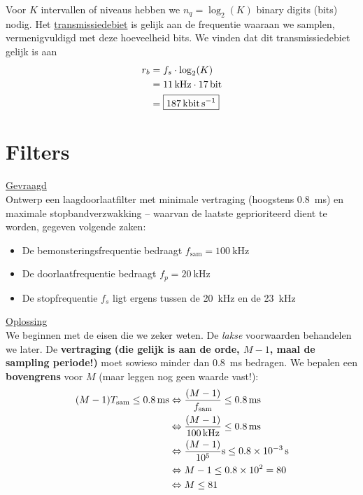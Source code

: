 \documentclass[kulak]{kulakarticle}
\newcommand{\sam}{\text{sam}}
\begin{document}
\begin{enumerate}
\begin{itemize}
			Voor \( K \) intervallen of niveaus hebben we \( n_q=\log_2(K) \) binary digits (bits) nodig. Het \underline{transmissiedebiet} is gelijk aan de frequentie waaraan we samplen, vermenigvuldigd met deze hoeveelheid bits. We vinden dat dit transmissiedebiet gelijk is aan \begin{align*}
				r_b &= f_s \cdot \log_2(K) \\
				&= \SI{11}{\kilo\hertz} \cdot \SI{17}{\bit} \\
				&= \boxed{\SI{187}{\kilo\bit\per\second}}
			\end{align*}

		\end{itemize}


	\end{enumerate}

	\newpage
	\section{Filters}


	\underline{Gevraagd} \\

	Ontwerp een laagdoorlaatfilter met minimale vertraging (hoogstens \SI{0.8}{\milli\second}) en maximale stopbandverzwakking -- waarvan de laatste geprioriteerd dient te worden, gegeven volgende zaken:

	\begin{itemize}
		\item De bemonsteringsfrequentie bedraagt \(f_{\text{sam}}=\SI{100}{\kilo\hertz}\)
		\item De doorlaatfrequentie bedraagt \(f_p=\SI{20}{\kilo\hertz}\)
		\item De stopfrequentie \(f_s\) ligt ergens tussen de \SI{20}{\kilo\hertz} en de \SI{23}{\kilo\hertz}
	\end{itemize}

	\underline{Oplossing}\\

	We beginnen met de eisen die we zeker weten. De \textit{lakse} voorwaarden behandelen we later. De \textbf{vertraging} \textbf{(die gelijk is aan de orde, \(M-1\), maal de sampling periode!)} moet sowieso minder dan \SI{0.8}{\milli\second} bedragen. We bepalen een \textbf{bovengrens} voor \(M\) (maar leggen nog geen waarde vast!):
	\begin{align*}
		(M-1) T_\sam \leq \SI{0.8}{\milli\second} &\Leftrightarrow \frac{(M-1)}{f_\sam}\leq \SI{0.8}{\milli\second} \\
		& \Leftrightarrow \frac{(M-1)}{\SI{100}{\kilo\hertz}}\leq \SI{0.8}{\milli\second} \\
		& \Leftrightarrow \frac{(M-1)}{10^5} \SI{}{\second}\leq \SI{0.8e{-3}}{\second} \\
		& \Leftrightarrow M-1 \leq \SI{0.8e2}{} = 80 \\
		& \Leftrightarrow M\leq81
	\end{align*}
\end{document}

